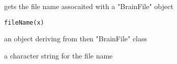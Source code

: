\begin{Description}\relax
gets the file name assocaited with a "BrainFile" object
\end{Description}
\begin{Usage}
\begin{verbatim}
fileName(x)
\end{verbatim}
\end{Usage}
\begin{Arguments}
\begin{ldescription}
\item[\code{x}] an object deriving from then "BrainFile" class 
\end{ldescription}
\end{Arguments}
\begin{Value}
a character string for the file name
\end{Value}

